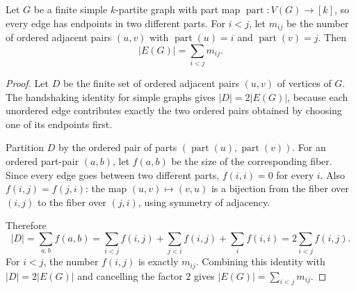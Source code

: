\begin{helper}
Let $G$ be a finite simple $k$-partite graph with part map
$\operatorname{part}:V(G)\to [k]$, so every edge has endpoints in two
different parts.  For $i<j$, let $m_{ij}$ be the number of ordered adjacent
pairs $(u,v)$ with $\operatorname{part}(u)=i$ and
$\operatorname{part}(v)=j$.  Then
\[
|E(G)|=\sum_{i<j} m_{ij}.
\]
\end{helper}
\begin{proof}
Let $D$ be the finite set of ordered adjacent pairs $(u,v)$ of vertices of
$G$.  The handshaking identity for simple graphs gives
$|D|=2|E(G)|$, because each unordered edge contributes exactly the two
ordered pairs obtained by choosing one of its endpoints first.

Partition $D$ by the ordered pair of parts
$(\operatorname{part}(u),\operatorname{part}(v))$.  For an ordered part-pair
$(a,b)$, let $f(a,b)$ be the size of the corresponding fiber.  Since every
edge goes between two different parts, $f(i,i)=0$ for every $i$.  Also
$f(i,j)=f(j,i)$: the map $(u,v)\mapsto (v,u)$ is a bijection from the fiber
over $(i,j)$ to the fiber over $(j,i)$, using symmetry of adjacency.

Therefore
\[
|D|=\sum_{a,b} f(a,b)
   =\sum_{i<j} f(i,j)+\sum_{j<i} f(i,j)+\sum_i f(i,i)
   =2\sum_{i<j} f(i,j).
\]
For $i<j$, the number $f(i,j)$ is exactly $m_{ij}$.  Combining this identity
with $|D|=2|E(G)|$ and cancelling the factor $2$ gives
$|E(G)|=\sum_{i<j}m_{ij}$.
\end{proof}
